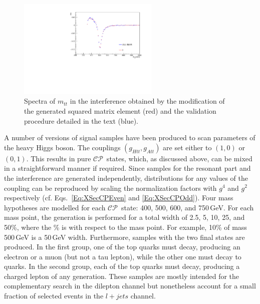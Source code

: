 \begin{figure}
  \centering
  \includegraphics[width=0.6\textwidth]{fig/chapt4/gen_plots/mtt_compare.pdf}
  \caption{Spectra of $m_{tt}$ in the interference obtained by the modification of the generated squared matrix element (red) and the validation procedure detailed in the text (blue).}
  \label{fig:GENcomparison_mtt}
\end{figure}

A number of versions of signal samples have been produced to scan parameters of the heavy Higgs boson.
The couplings $(g_{Htt}, g_{Att})$ are set either to $(1, 0)$ or $(0, 1)$.
This results in pure $\mathcal{CP}$~states, which, as discussed above, can be mixed in a straightforward manner if required.
Since samples for the resonant part and the interference are generated independently, distributions for any values of the coupling can be reproduced by scaling the normalization factors with $g^4$ and $g^2$ respectively (cf. Eqs.~\ref{Eq:XSecCPEven} and \ref{Eq:XSecCPOdd}).
Four mass hypotheses are modelled for each $\mathcal{CP}$~state: 400, 500, 600, and 750\,GeV.
For each mass point, the generation is performed for a total width of 2.5, 5, 10, 25, and 50\%, where the \% is with respect to the mass point. For example, 10\% of mass 500\,GeV is a 50\,GeV width.
Furthermore, samples with the two final states are produced.
In the first group, one of the top quarks must decay, producing an electron or a muon (but not a tau lepton), while the other one must decay to quarks.
In the second group, each of the top quarks must decay, producing a charged lepton of any generation.
These samples are mostly intended for the complementary search in the dilepton channel but nonetheless account for a small fraction of selected events in the $l+jets$ channel.

